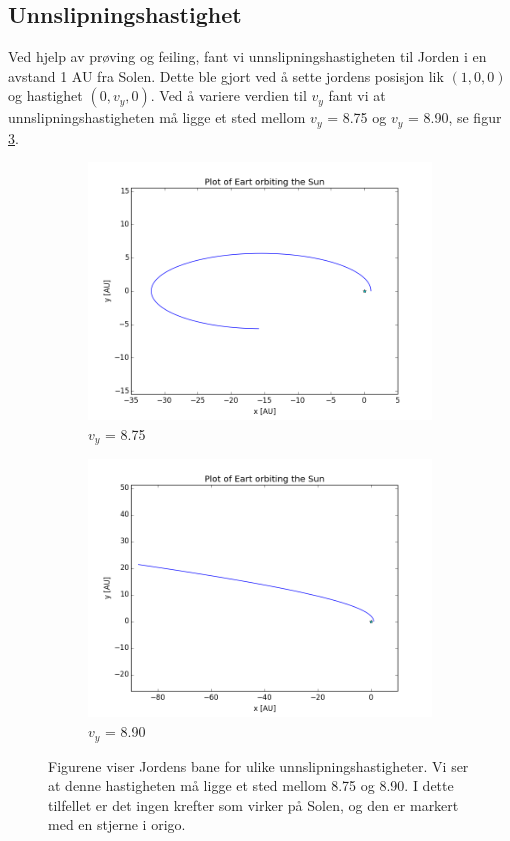 \documentclass[11pt,a4paper]{article}
\begin{document}
\subsection{Unnslipningshastighet}
Ved hjelp av prøving og feiling, fant vi unnslipningshastigheten til Jorden i en avstand 1 AU fra Solen. Dette ble gjort ved å sette jordens posisjon lik $(1,0,0)$ og hastighet $(0,v_y,0)$. Ved å variere verdien til $v_y$ fant vi at unnslipningshastigheten må ligge et sted mellom $v_y$ = 8.75 og $v_y$ = 8.90, se figur \ref{fig:uh}. 

\FloatBarrier
\begin{figure}[!ht]
\centering
\begin{subfigure}{.5\textwidth}
  \centering
  \includegraphics[width=1.1\linewidth]{3d_escape_v_8_75.png}
  \caption{$v_y$ = 8.75}
  \label{fig:sub1}
\end{subfigure}%
\begin{subfigure}{.5\textwidth}
  \centering
  \includegraphics[width=1.1\linewidth]{3d_escape_v_8_9.png}
  \caption{$v_y$ = 8.90}
  \label{fig:sub2}
\end{subfigure}
\caption{Figurene viser Jordens bane for ulike unnslipningshastigheter. Vi ser at denne hastigheten må ligge et sted mellom 8.75 og 8.90. I dette tilfellet er det ingen krefter som virker på Solen, og den er markert med en stjerne i origo.}
\label{fig:uh}
\end{figure}
\FloatBarrier
\end{document}
